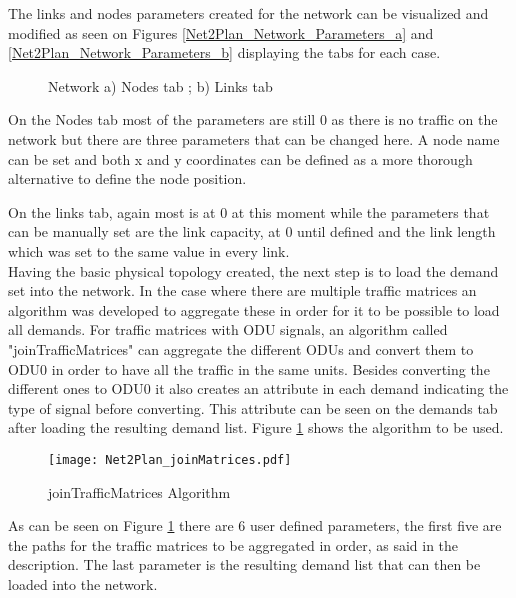 \documentclass[12pt, a4paper]{article}
\begin{document}
	The links and nodes parameters created for the network can be visualized and modified as seen on Figures \ref{Net2Plan_Network_Parameters_a} and \ref{Net2Plan_Network_Parameters_b} displaying the tabs for each case.
	

	\begin{figure}[!h]
		\centering
		\caption{Network a) Nodes tab ; b) Links tab}
	\end{figure}	
	
	On the Nodes tab most of the parameters are still 0 as there is no traffic on the network but there are three parameters that can be changed here. A node name can be set and both x and y coordinates can be defined as a more thorough alternative to define the node position.
	
	On the links tab, again most is at 0 at this moment while the parameters that can be manually set are the link capacity, at 0 until defined and the link length which was set to the same value in every link.\\
	
	Having the basic physical topology created, the next step is to load the demand set into the network. In the case where there are multiple traffic matrices an algorithm was developed to aggregate these in order for it to be possible to load all demands.
	For traffic matrices with ODU signals, an algorithm called "joinTrafficMatrices" can aggregate the different ODUs and convert them to ODU0 in order to have all the traffic in the same units. Besides converting the different ones to ODU0 it also creates an attribute in each demand indicating the type of signal before converting. This attribute can be seen on the demands tab after loading the resulting demand list. Figure \ref{joinMatrices} shows the algorithm to be used.
	

	\begin{figure}[h!]
		\centering
		\texttt{[image: Net2Plan\_joinMatrices.pdf]}
		\caption{joinTrafficMatrices Algorithm}
		\label{joinMatrices}		
	\end{figure}
	
	As can be seen on Figure \ref{joinMatrices} there are 6 user defined parameters, the first five are the paths for the traffic matrices to be aggregated in order, as said in the description. The last parameter is the resulting demand list that can then be loaded into the network.
	
\end{document}
